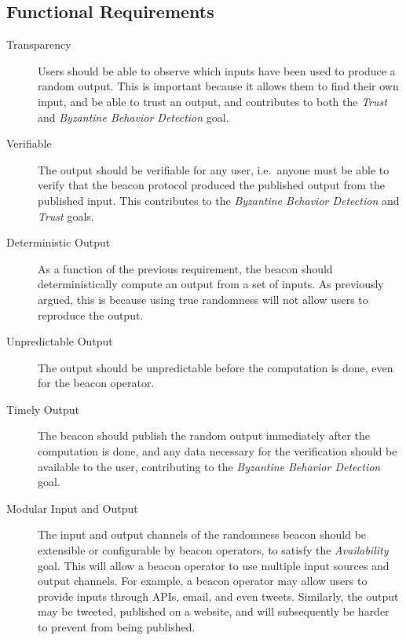 \subsection{Functional Requirements}%
\label{sub:functional_requirements}
\begin{description}
    \item [Transparency]
Users should be able to observe which inputs have been used to produce a random output. This is important because it allows them to find their own input, and be able to trust an output, and contributes to both the \emph{Trust} and \emph{Byzantine Behavior Detection} goal.

    \item[Verifiable]
The output should be verifiable for any user, i.e.\ anyone must be able to verify that the beacon protocol produced the published output from the published input. This contributes to the \emph{Byzantine Behavior Detection} and \emph{Trust} goals.

    \item[Deterministic Output]
As a function of the previous requirement, the beacon should deterministically compute an output from a set of inputs.
As previously argued, this is because using true randomness will not allow users to reproduce the output.

    \item[Unpredictable Output]
The output should be unpredictable before the computation is done, even for the beacon operator.

    \item[Timely Output]
The beacon should publish the random output immediately after the computation is done, and any data necessary for the verification should be available to the user, contributing to the \emph{Byzantine Behavior Detection} goal.

    \item[Modular Input and Output]
The input and output channels of the randomness beacon should be extensible or configurable by beacon operators, to satisfy the \emph{Availability} goal.
This will allow a beacon operator to use multiple input sources and output channels.
For example, a beacon operator may allow users to provide inputs through APIs, email, and even tweets.
Similarly, the output may be tweeted, published on a website, and will subsequently be harder to prevent from being published.




\end{description}
